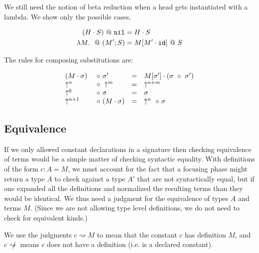 \documentclass[11pt,twoside]{article}
\begin{document}
We still need the notion of beta reduction when a 
head gets instantiated with a lambda.  We show
only the possible cases.

\bigskip 
{}

\begin{align*} 
(H\cdot S)~@~\mathtt{nil} &= H\cdot S\\
\lambda M.\ ~@~(M';S) &= M[M'\cdot\mathtt{id}]~@~ S
\end{align*} 

The rules for composing substitutions are:

\bigskip 
{}

$$
\begin{array}{llll}
(M\cdot \sigma) & ~\circ~ \sigma' &= &M[\sigma']\cdot (\sigma~\circ~\sigma') \\
\uparrow^n & ~\circ~ \uparrow^m &= &\uparrow^{n+m}\\
\uparrow^0 & ~\circ~ \sigma &= &\sigma\\
\uparrow^{n+1}&~\circ~ (M\cdot\sigma) &= &\uparrow^n~\circ~\sigma
\end{array} 
$$


\subsection{Equivalence} 

If we only allowed constant declarations in a signature then checking equivalence
of terms would be a simple matter of checking syntactic equality.  
With definitions of the form $c : A = M$, we must account
for the fact that a focusing phase might return a type $A$ to 
check against a type $A'$ that are not syntactically equal, but
if one expanded all the definitions and normalized the resulting
terms than they would be identical.  We thus need a judgment for the
equivalence of types $A$ and terms $M$.  (Since we are not allowing
type level definitions, we do not need to check for equivalent kinds.)

\newcommand{\StepsTo}{\rightsquigarrow}
\newcommand{\NoStep}{\not\rightsquigarrow}

We use the judgments $c\StepsTo M$  to mean
that the constant $c$ has definition $M$, and $c\NoStep$ means
$c$ does not have a definition (i.e. is a declared constant).
\end{document}
